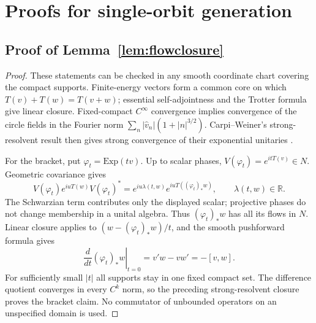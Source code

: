 \documentclass[12pt]{article}
\theoremstyle{definition}
\theoremstyle{remark}
\begin{document}
\appendix

\section{Proofs for single-orbit generation}\label{app:singleorbit-proofs}
\subsection{Proof of Lemma~\ref{lem:flowclosure}}
\begin{proof}
These statements can be checked in any smooth coordinate chart covering the
compact supports. Finite-energy vectors form a common core on which
\(T(v)+T(w)=T(v+w)\); essential self-adjointness and the Trotter formula give
linear closure. Fixed-compact \(C^\infty\) convergence implies convergence of
the circle fields in the Fourier norm
\(\sum_n|\hat v_n|(1+|n|^{3/2})\). Carpi--Weiner's strong-resolvent result then
gives strong convergence of their exponential unitaries
\cite[Thm.~4.4, Prop.~4.5]{CW}.

For the bracket, put \(\varphi_t=\mathrm{Exp}(tv)\). Up to scalar phases,
\(V(\varphi_t)=e^{itT(v)}\in N\). Geometric covariance gives
\[
 V(\varphi_t)e^{iuT(w)}V(\varphi_t)^*
   =e^{iu\lambda(t,w)}e^{iuT((\varphi_t)_*w)},\qquad \lambda(t,w)\in\mathbb R .
\]
The Schwarzian term contributes only the displayed scalar; projective phases
do not change membership in a unital algebra. Thus
\((\varphi_t)_*w\) has all its flows in \(N\). Linear closure applies to
\((w-(\varphi_t)_*w)/t\), and the smooth pushforward formula gives
\[
 \left.\frac{d}{dt}(\varphi_t)_*w\right|_{t=0}
       =v'w-vw'=-[v,w].
\]
For sufficiently small \(|t|\) all supports stay in one fixed compact set.
The difference quotient converges in every \(C^k\) norm, so the preceding
strong-resolvent closure proves the bracket claim. No commutator of unbounded
operators on an unspecified domain is used.
\end{proof}
\end{document}
